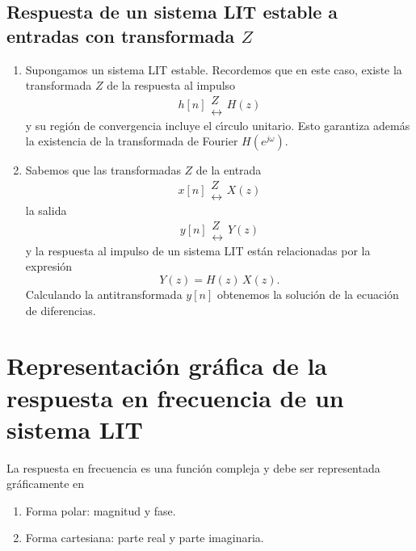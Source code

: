 \subsection{Respuesta de un sistema LIT estable a entradas con transformada $Z$}

\begin{enumerate}

\item Supongamos un sistema LIT estable. Recordemos que en este caso, existe la transformada $Z$ de la
respuesta al impulso
\begin{equation}
  h[n] \begin{array}{c} Z \\ \leftrightarrow \end{array} H(z)
\end{equation}
y su regi\'{o}n de convergencia incluye el c\'{\i}rculo unitario. Esto garantiza adem\'{a}s la existencia
de la transformada de Fourier $H(e^{j \omega})$.

\item Sabemos que las transformadas $Z$ de la entrada
\begin{equation}
  x[n] \begin{array}{c} Z \\ \leftrightarrow \end{array} X(z)
\end{equation}
la salida
\begin{equation}
  y[n] \begin{array}{c} Z \\ \leftrightarrow \end{array} Y(z)
\end{equation}
y la respuesta al impulso 
de un sistema LIT est\'{a}n relacionadas por la expresi\'{o}n
\begin{equation}
   Y(z) = H(z) \, X(z).
\end{equation}
Calculando la antitransformada $y[n]$ obtenemos la solución de la ecuación de diferencias.

\end{enumerate}
\section{Representaci\'{o}n gr\'{a}fica de la respuesta en frecuencia de un sistema LIT}

La respuesta en frecuencia es una funci\'{o}n compleja y debe ser representada gr\'{a}ficamente en
\begin{enumerate}
        \item   Forma polar: magnitud y fase.
        
        \item   Forma cartesiana: parte real y parte imaginaria.
\end{enumerate}

